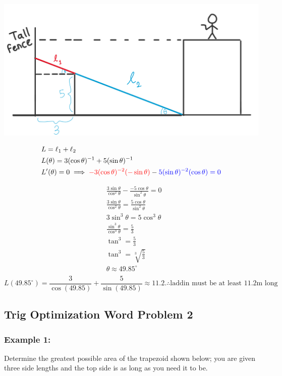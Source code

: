 \documentclass{article}
\begin{document}
\begin{minipage}{0.5\textwidth}
  \centering
  \includegraphics[width=\textwidth]{imgs/op2.png}
\end{minipage}%
\begin{minipage}{0.5\textwidth}
    \begin{align*}
        &L=\ell_1+\ell_2\\
        &L(\theta)=3(\cos\theta)^{-1}+5(\sin \theta)^{-1}\\
        &L'(\theta)=0 \implies \textcolor{red}{-3(\cos\theta)^{-2}(-\sin\theta)}-\textcolor{blue}{5(\sin \theta)^{-2}(\cos \theta)=0}
    \end{align*}
\end{minipage}
\begin{align*}
    &\frac{3\sin\theta}{\cos^2\theta}-\frac{-5\cos \theta}{\sin^2\theta}=0\\
    &\frac{3\sin \theta}{\cos^2\theta}=\frac{5\cos \theta}{\sin^2\theta}\\
    &3\sin^3\theta=5\cos^3\theta\\
    &\frac{\sin^3\theta}{\cos^3\theta}=\frac{5}{3}\\
    &\tan^3=\frac{5}{3}\\
    &\tan^3=\sqrt[3]{\frac{5}{3}}\\
    &\theta \approx49.85^{\circ}\\
\end{align*}
$$L(49.85^{\circ})=\frac{3}{\cos(49.85)}+\frac{5}{\sin(49.85)}\approx 11.2. \therefore \text{laddin must be at least 11.2m long} $$
\newpage 
\subsection{Trig Optimization Word Problem 2}
\subsubsection*{Example 1: }
Determine the greatest possible area of the trapezoid shown below; you are given three side lengths and the top side is as long as you need it to be.
\end{document}
